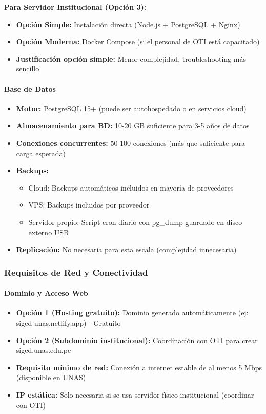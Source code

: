 \documentclass[12pt,a4paper]{article}
\begin{document}
\textbf{Para Servidor Institucional (Opción 3):}
\begin{itemize}[noitemsep]
    \item \textbf{Opción Simple:} Instalación directa (Node.js + PostgreSQL + Nginx)
    \item \textbf{Opción Moderna:} Docker Compose (si el personal de OTI está capacitado)
    \item \textbf{Justificación opción simple:} Menor complejidad, troubleshooting más sencillo
\end{itemize}

\paragraph{Base de Datos}

\begin{itemize}[noitemsep]
    \item \textbf{Motor:} PostgreSQL 15+ (puede ser autohospedado o en servicios cloud)
    \item \textbf{Almacenamiento para BD:} 10-20 GB suficiente para 3-5 años de datos 
    \item \textbf{Conexiones concurrentes:} 50-100 conexiones (más que suficiente para carga esperada)
    \item \textbf{Backups:} 
    \begin{itemize}
        \item Cloud: Backups automáticos incluidos en mayoría de proveedores
        \item VPS: Backups incluidos por proveedor 
        \item Servidor propio: Script cron diario con pg\_dump guardado en disco externo USB
    \end{itemize}
    \item \textbf{Replicación:} No necesaria para esta escala (complejidad innecesaria)
\end{itemize}

\subsubsection{Requisitos de Red y Conectividad}

\paragraph{Dominio y Acceso Web}

\begin{itemize}[noitemsep]
    \item \textbf{Opción 1 (Hosting gratuito):} Dominio generado automáticamente (ej: siged-unas.netlify.app) - Gratuito
    \item \textbf{Opción 2 (Subdominio institucional):} Coordinación con OTI para crear siged.unas.edu.pe
    \item \textbf{Requisito mínimo de red:} Conexión a internet estable de al menos 5 Mbps (disponible en UNAS)
    \item \textbf{IP estática:} Solo necesaria si se usa servidor físico institucional (coordinar con OTI)
\end{itemize}
\end{document}
